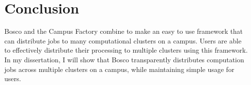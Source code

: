 \section{Conclusion}

Bosco and the Campus Factory combine to make an easy to use framework that can distribute jobs to many computational clusters on a campus.  Users are able to effectively distribute their processing to multiple clusters using this framework.  In my dissertation, I will show that Bosco transparently distributes computation jobs across multiple clusters on a campus, while maintaining simple usage for users.

